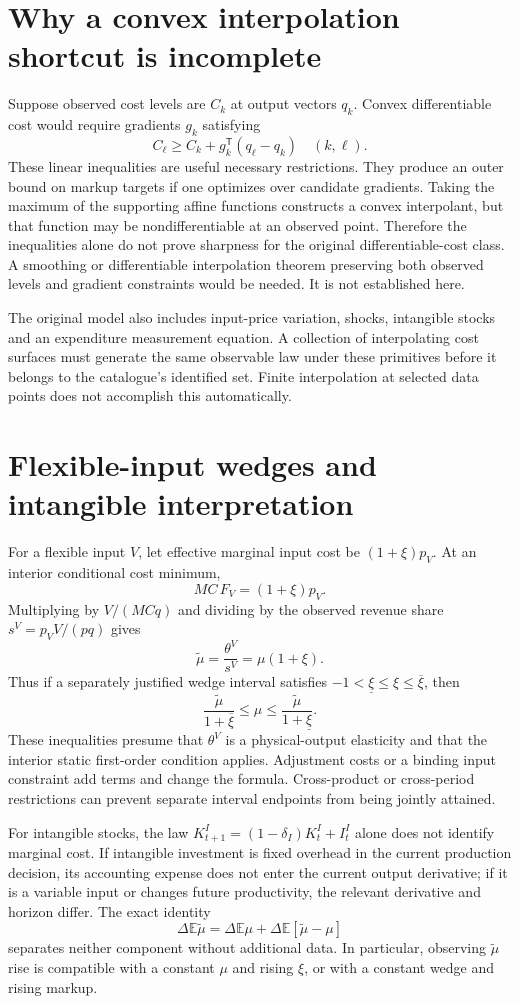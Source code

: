 \documentclass[11pt]{article}
\newcommand{\E}{\mathbb E}
\begin{document}
\section*{Why a convex interpolation shortcut is incomplete}
Suppose observed cost levels are $C_k$ at output vectors $q_k$. Convex differentiable cost would require gradients $g_k$ satisfying
\[
 C_\ell\geq C_k+g_k^{\mathsf T}(q_\ell-q_k)\quad(k,\ell).
\]
These linear inequalities are useful necessary restrictions. They produce an outer bound on markup targets if one optimizes over candidate gradients. Taking the maximum of the supporting affine functions constructs a convex interpolant, but that function may be nondifferentiable at an observed point. Therefore the inequalities alone do not prove sharpness for the original differentiable-cost class. A smoothing or differentiable interpolation theorem preserving both observed levels and gradient constraints would be needed. It is not established here.

The original model also includes input-price variation, shocks, intangible stocks and an expenditure measurement equation. A collection of interpolating cost surfaces must generate the same observable law under these primitives before it belongs to the catalogue's identified set. Finite interpolation at selected data points does not accomplish this automatically.

\section*{Flexible-input wedges and intangible interpretation}
For a flexible input $V$, let effective marginal input cost be $(1+\xi)p_V$. At an interior conditional cost minimum,
\[
 MC\,F_V=(1+\xi)p_V.
\]
Multiplying by $V/(MCq)$ and dividing by the observed revenue share $s^V=p_VV/(pq)$ gives
\[
 \widetilde\mu=\frac{\theta^V}{s^V}=\mu(1+\xi).
\]
Thus if a separately justified wedge interval satisfies $-1<\underline\xi\leq\xi\leq\overline\xi$, then
\[
 \frac{\widetilde\mu}{1+\overline\xi}\leq\mu\leq
 \frac{\widetilde\mu}{1+\underline\xi}.
\]
These inequalities presume that $\theta^V$ is a physical-output elasticity and that the interior static first-order condition applies. Adjustment costs or a binding input constraint add terms and change the formula. Cross-product or cross-period restrictions can prevent separate interval endpoints from being jointly attained.

For intangible stocks, the law $K^I_{t+1}=(1-\delta_I)K^I_t+I^I_t$ alone does not identify marginal cost. If intangible investment is fixed overhead in the current production decision, its accounting expense does not enter the current output derivative; if it is a variable input or changes future productivity, the relevant derivative and horizon differ. The exact identity
\[
 \Delta\E\widetilde\mu=\Delta\E\mu+
 \Delta\E[\widetilde\mu-\mu]
\]
separates neither component without additional data. In particular, observing $\widetilde\mu$ rise is compatible with a constant $\mu$ and rising $\xi$, or with a constant wedge and rising markup.
\end{document}
